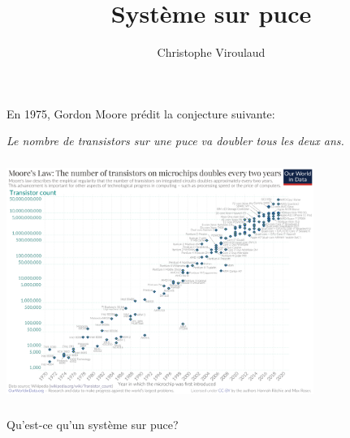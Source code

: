 \documentclass[svgnames,11pt]{beamer}
\author[]{Christophe Viroulaud}
\title{Système sur puce}
\date{\framebox{\textbf{Archi 18}}}
\institute{Terminale - NSI}
\begin{document}
\begin{frame}
\titlepage
\end{frame}
\begin{frame}
    \frametitle{}

    En 1975, Gordon Moore prédit la conjecture suivante:
    \begin{center}
        \emph{Le nombre de transistors sur une puce va doubler tous les deux ans.}
    \end{center}
\end{frame}
\begin{frame}
    \frametitle{}

    \begin{center}
        \includegraphics[width=10cm]{ressources/moore.png}
    \end{center}

\end{frame}
\begin{frame}
    \frametitle{}

    \begin{framed}
        \centering Qu'est-ce qu'un système sur puce?
    \end{framed}

\end{frame}
\end{document}
